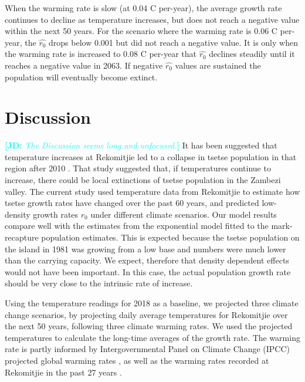 \documentclass[12pt,a4paper]{article}
\newcommand{\comment}[3]{\textcolor{#1}{\textbf{[#2: }\textsl{#3}\textbf{]}}}
\newcommand{\jd}[1]{\comment{cyan}{JD}{#1}}
\begin{document}
When the warming rate is slow (at 0.04 \textdegree C per-year), the average growth rate continues to decline as temperature increases, but does not reach a negative value within the next 50 years. For the scenario where the warming rate is 0.06 \textdegree C per-year, the $\hat{r_0}$ drops below 0.001 but did not reach a negative value. It is only when the warming rate is increased to 0.08 \textdegree C per-year that $\hat{r_0}$ declines steadily until it reaches a negative value in 2063. If negative $\hat{r_0}$ values are sustained the population will eventually become extinct.


\section*{Discussion}

\jd{The Discussion seems long and unfocused.} 
It has been suggested that temperature increases at Rekomitjie led to a collapse in tsetse population in that region after 2010 \cite{Lord2018}. That study suggested that, if temperatures continue to increase, there could be local extinctions of tsetse population in the Zambezi valley.  The current study used temperature data from Rekomitjie to estimate how tsetse growth rates have changed over the past 60 years, and predicted low-density growth rates $r_0$ under different climate scenarios. Our model results compare well with the estimates from the exponential model fitted to the mark-recapture population estimates. This is expected because the tsetse population on the island in 1981 was growing from a low base and numbers were much lower than the carrying capacity. We expect, therefore that density dependent effects would not have been important. In this case, the actual population growth rate should be very close to the intrinsic rate of increase.

 Using the temperature readings for 2018 as a baseline, we projected three climate change scenarios, by projecting daily average temperatures for Rekomitjie over the next 50 years, following three climate warming rates. We used the projected temperatures to calculate the long-time averages of the growth rate. The warming rate is partly informed by Intergovernmental Panel on Climate Change (IPCC) projected global warming rates \cite{IPCC2007}, as well as the warming rates recorded at Rekomitjie in the past 27 years \cite{Lord2018}.
\end{document}
